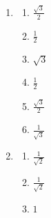 \begin{solutions}{}
{\begin{enumerate}[itemsep=5pt, label=\textbf{\arabic*}. ]
\begin{multicols}{2}
\end{multicols}
\item %
\begin{multicols}{2}
\begin{enumerate}[itemsep=1pt, label=\textbf{(\alph*)} ]
\item $\frac{\sqrt{3}}{2}$%
\item $\frac{1}{2}$%
\item $\sqrt{3}$%
\item $\frac{1}{2}$%
\item $\frac{\sqrt{3}}{2}$%
\item $\frac{1}{\sqrt{3}}$%
\end{enumerate}

\end{multicols}
\item %
\begin{multicols}{2}
\begin{enumerate}[itemsep=1pt, label=\textbf{(\alph*)} ]
\item $\frac{1}{\sqrt{2}}$%
\item $\frac{1}{\sqrt{2}}$%
\item $1$%
\end{enumerate}
\end{multicols}
\end{enumerate}}
\end{solutions}

